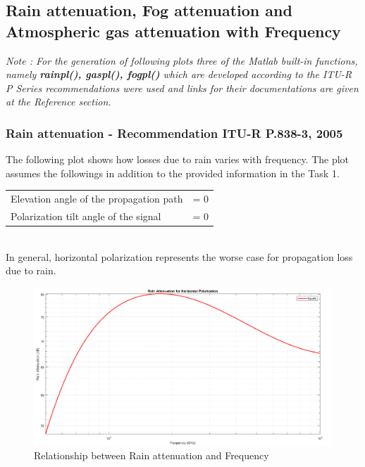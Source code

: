 \documentclass[a4paper,11pt]{article}%
\begin{document}
\pagebreak
\subsection{Rain attenuation, Fog attenuation and Atmospheric gas attenuation with Frequency}

\textit{Note : For the generation of following plots three of the Matlab built-in functions, namely \textbf{rainpl()\cite{matlab}, gaspl()\cite{matlab}, fogpl()\cite{matlab}} which are developed according to the ITU-R P Series recommendations were used and links for their documentations are given at the Reference section.}


\subsubsection{Rain attenuation - Recommendation ITU-R P.838-3, 2005\cite{rain}}
The following plot shows how losses due to rain varies with frequency. The plot assumes the followings in addition to the provided information in the Task 1.\\

\begin{tabular}{l l}
Elevation angle of the propagation path& = 0 \\
Polarization tilt angle of the signal &= 0\\
\end{tabular}\\

In general, horizontal polarization represents the worse case for propagation loss due to rain.

\begin{figure}[!h]
	\centering
	\includegraphics[scale=0.35]{figures/RainPL.png}
	\caption{Relationship between Rain attenuation and Frequency}
\end{figure}
\end{document}
